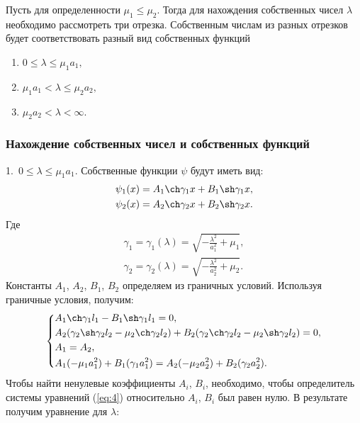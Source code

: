 \documentclass[12pt, a4paper]{article}
\begin{document}
Пусть для определенности $\mu_1 \le \mu_2$. Тогда для нахождения собственных чисел $\lambda$ необходимо рассмотреть три отрезка. Собственным числам из разных отрезков будет соответствовать разный вид собственных функций
\begin{enumerate}
  \item $ 0 \le \lambda \le \mu_1a_1, $
  \item $ \mu_1a_1 < \lambda \le \mu_2a_2, $
  \item $ \mu_2a_2 < \lambda < \infty. $
\end{enumerate}
\subsubsection{Нахождение собственных чисел и собственных функций}
1.\ $ 0 \le \lambda \le \mu_1a_1$. Собственные функции $\psi$ будут иметь вид:
\begin{equation}
  \begin{aligned}
    \psi_1(x) = A_1 \ch \gamma_1x + B_1 \sh \gamma_1x, \\
    \psi_2(x) = A_2 \ch \gamma_2x + B_2 \sh \gamma_2x.
  \end{aligned}
  \label{eq:5}
\end{equation}
Где 
\begin{equation}
  \begin{aligned}
    \gamma_1 = \gamma_1(\lambda) = \sqrt{- \frac{\lambda^2}{a_1^2} + \mu_1}, \\
    \gamma_2 = \gamma_2(\lambda) = \sqrt{- \frac{\lambda^2}{a_2^2} + \mu_2}.
  \end{aligned}
\end{equation}
Константы $A_1$, $A_2$, $B_1$, $B_2$ определяем из граничных условий. Используя граничные условия, получим:
\begin{equation}
  \left\{  
  \begin{aligned}
    & A_1 \ch \gamma_1l_1 - B_1 \sh \gamma_1l_1 = 0, \\
    & A_2 (\gamma_2\sh \gamma_2l_2 - \mu_2\ch \gamma_2l_2) + B_2 (\gamma_2\ch \gamma_2l_2 - \mu_2\sh \gamma_2l_2) = 0, \\
    & A_1 = A_2, \\
    & A_1 (-\mu_1a_1^2) + B_1 (\gamma_1a_1^2) = A_2 (-\mu_2a_2^2) + B_2 (\gamma_2a_2^2).
  \end{aligned}
  \right.
  \label{eq:4}
\end{equation}
Чтобы найти ненулевые коэффициенты $A_i$, $B_i$, необходимо, чтобы определитель системы уравнений (\ref{eq:4}) относительно $A_i$, $B_i$ был равен нулю. В результате получим уравнение для $\lambda$:
\end{document}
